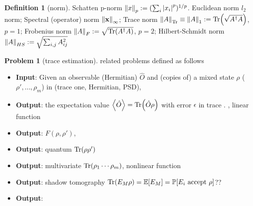 \documentclass[
10pt,
aps,
pra,
linenumbers,
floatfix,
]{revtex4-2}
\theoremstyle{plain}
\theoremstyle{definition}
\newtheorem{definition}{Definition}
\newtheorem{problem}{Problem}
\newcommand{\ob}{\hat{O}}
\newcommand{\dm}{\rho}
\begin{document}
\begin{definition}[norm]\label{def:norm}
	Schatten p-norm $\norm{x}_p:= (\sum_i \abs{x_i}^p)^{1/p}$.
	Euclidean norm $l_2$ norm;
	Spectral (operator) norm $\norm{\vb{x}}_{\infty}$;
	Trace norm $\norm{A}_{\Tr}\equiv\norm{A}_{1}:=\Tr(\sqrt{A^\dagger A})$, $p=1$;
	Frobenius norm $\norm{A}_{F}:=\sqrt{\Tr(A^\dagger A)}$, $p=2$;
	Hilbert-Schmidt norm $\norm{A}_{HS}:=\sqrt{\sum_{i,j} A_{ij}^2 }$
\end{definition}
\begin{problem}[trace estimation]\label{prm:trace_estimation}
	related problems defined as follows
	\begin{itemize}
		\item \textbf{Input}: Given an observable (Hermitian) $\ob$ and (copies of) a mixed state $\dm$ ($\dm',\dots,\dm_m$) in (trace one, Hermitian, PSD), 
		\item \textbf{Output}: the expectation value $\expval{\ob}=\Tr(\ob \dm) $ with error $\epsilon$ in trace . , linear function
		\item \textbf{Output}:  $F(\dm,\dm')$, 
		\item \textbf{Output}: quantum  $\Tr(\dm\dm')$
		\item \textbf{Output}: multivariate $\Tr(\dm_1 \cdots \dm_m)$, nonlinear function
		\item \textbf{Output}: shadow tomography $\Tr(E_M\dm) = \expectation[E_M] = \probability[E_i \text{ accept } \dm]$??
		\item \textbf{Output}: 
	\end{itemize}
\end{problem}
\end{document}
